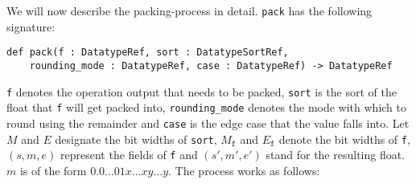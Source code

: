\documentclass[a4paper,UKenglish,cleveref, autoref, thm-restate]{lipics-v2019}
\begin{document}
We will now describe the packing-process in detail. \verb|pack| has the following signature:
\begin{lstlisting}
def pack(f : DatatypeRef, sort : DatatypeSortRef, 
    rounding_mode : DatatypeRef, case : DatatypeRef) -> DatatypeRef
\end{lstlisting}
\verb|f| denotes the operation output that needs to be packed, \verb|sort| is the sort of the float that \verb|f| will get packed into, \verb|rounding_mode| denotes the mode with which to round using the remainder and \verb|case| is the edge case that the value falls into.
Let $M$ and $E$ designate the bit widths of \verb|sort|, $M_{\texttt{f}}$ and $E_{\texttt{f}}$ denote the bit widths of \verb|f|, $(s, m, e)$ represent the fields of \verb|f| and $(s', m', e')$ stand for the resulting float. $m$ is of the form $0.0\dots01x\dots xy\dots y$.
The process works as follows:
\end{document}
